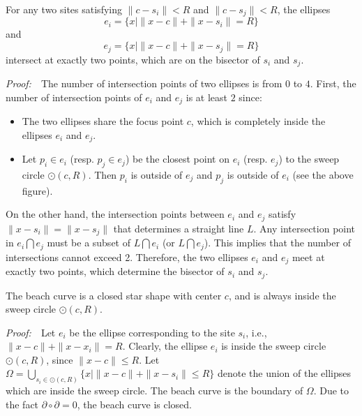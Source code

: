 {{\vspace{0.1in}
\begin{lemma}\label{lema2} For any two sites satisfying
$\|c-s_i\|<R$ and $\|c-s_j\|<R$, the ellipses
$$e_i=\{x|\|x-c\|+\|x-s_i\|=R\}$$
and
$$e_j=\{x|\|x-c\|+\|x-s_j\|=R\}$$
intersect at exactly two points, which are on the bisector of $s_i$ and
$s_j$.
\end{lemma}
\vspace{0.1in}\noindent\textit{Proof:}~~The number of intersection
points of two ellipses is from $0$ to $4$. First, the number of
intersection points of $e_i$ and $e_j$ is at least $2$ since:
\vspace{0.1in}
\begin{itemize}
\item The two ellipses share the focus point $c$, which is completely inside the ellipses $e_i$ and $e_j$.
\item Let $p_i\in e_i$ (resp. $p_j\in e_j$) be the closest point on $e_i$ (resp. $e_j$) to the sweep circle $\odot(c,R)$. Then $p_i$ is outside of $e_j$ and $p_j$ is outside of $e_i$ (see the above figure).
\end{itemize}
On the other hand, the intersection points between $e_i$ and $e_j$
satisfy $\|x-s_i\|=\|x-s_j\|$ that determines a straight line $L$. Any intersection point in $e_i\bigcap e_j$
must be a subset of $L\bigcap e_i$ (or $L\bigcap e_j$). This implies that the number of intersections
cannot exceed 2. Therefore, the two ellipses $e_i$ and $e_j$ meet at exactly
two points, which determine the bisector of $s_i$ and $s_j$.


\vspace{0.1in}
\begin{lemma}\label{lema3} The beach curve is a closed star
shape with center $c$, and is always inside the sweep circle
$\odot(c,R)$.
\end{lemma}
\vspace{0.1in}\noindent\textit{Proof:}~~Let $e_i$ be the ellipse
corresponding to the site $s_i$, i.e., $\|x-c\|+\|x-x_i\|=R$. Clearly, the
ellipse $e_i$ is inside the sweep circle $\odot(c,R)$, since
$\|x-c\|\leq R$. Let $\Omega=\bigcup_{s_i\in\odot(c,R)} \{x\mid
\|x-c\|+\|x-s_i\|\leq R\}$ denote the union of the ellipses which
are inside the sweep circle. The beach curve is the boundary of
$\Omega$. Due to the fact $\partial\circ\partial=0$, the beach curve
is closed.

}}
